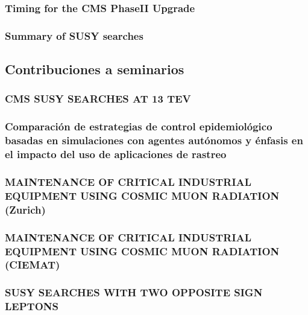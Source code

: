 \documentclass[a4paper, 11pt, twoside, openright]{report}
\begin{document}
\subsubsection{Timing for the CMS PhaseII Upgrade}

\subsubsection{Summary of SUSY searches}


\subsection{Contribuciones a seminarios}

\subsubsection{CMS SUSY SEARCHES AT 13 TEV}


\subsubsection{Comparación de estrategias de control epidemiológico basadas en simulaciones con agentes autónomos y énfasis en el impacto del uso de aplicaciones de rastreo}


\subsubsection{MAINTENANCE OF CRITICAL INDUSTRIAL EQUIPMENT USING COSMIC MUON RADIATION (Zurich)}


\subsubsection{MAINTENANCE OF CRITICAL INDUSTRIAL EQUIPMENT USING COSMIC MUON RADIATION (CIEMAT)}


\subsubsection{SUSY SEARCHES WITH TWO OPPOSITE SIGN LEPTONS}

\end{document}
